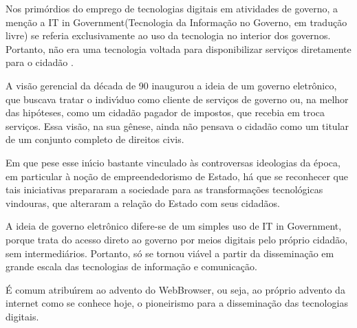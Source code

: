 \documentclass[
12pt,		%
openright,	%
twoside,  %
a4paper,			%
chapter=TITLE,		%
english,			%
french,				%
spanish,			%
brazil				%
]{USPSC-classe/USPSC}
\begin{document}
Nos prim\'ordios do emprego de tecnologias digitais em atividades de governo, a men\c{c}\~ao a \textquotedbl IT in Government\textquotedbl  (Tecnologia da Informa\c{c}\~ao no Governo, em tradu\c{c}\~ao livre) se referia exclusivamente ao uso da tecnologia no interior dos governos. Portanto, n\~ao era uma tecnologia voltada para disponibilizar servi\c{c}os diretamente para o cidad\~ao .








A vis\~ao gerencial da d\'ecada de 90 inaugurou a ideia de um \textquotedbl governo eletr\^onico\textquotedbl , que buscava tratar o indiv\'{\i}duo como \textquotedbl  cliente \textquotedbl  de servi\c{c}os de governo ou, na melhor das hip\'oteses, como um cidad\~ao \textquotedbl pagador de impostos\textquotedbl , que recebia em troca servi\c{c}os. Essa vis\~ao, na sua g\^enese, ainda n\~ao pensava o cidad\~ao como um titular de um conjunto completo de direitos civis.








Em que pese esse in\'{\i}cio bastante vinculado \`as controversas ideologias da \'epoca, em particular \`a no\c{c}\~ao de \textquotedbl empreendedorismo de Estado\textquotedbl , h\'a que se reconhecer que tais iniciativas prepararam a sociedade para as transforma\c{c}\~oes tecnol\'ogicas vindouras, que alteraram a rela\c{c}\~ao do Estado com seus cidad\~aos.








A ideia de governo eletr\^onico difere-se de um simples uso de \textquotedbl IT in Government\textquotedbl , porque trata do acesso direto ao governo por meios digitais pelo pr\'oprio cidad\~ao, sem intermedi\'arios. Portanto, s\'o se tornou vi\'avel a partir da dissemina\c{c}\~ao em grande escala das tecnologias de informa\c{c}\~ao e comunica\c{c}\~ao.








\'E comum atribu\'{\i}rem ao advento do WebBrowser, ou seja, ao pr\'oprio advento da internet como se conhece hoje, o pioneirismo para a dissemina\c{c}\~ao das tecnologias digitais.
\end{document}
